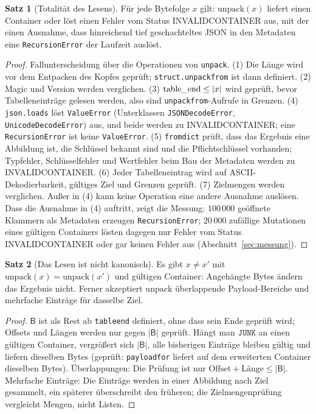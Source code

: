 \documentclass[a4paper,12pt,twoside]{report}
\DeclareRobustCommand{\_}{\ifmmode\mbox{\textunderscore}\else\textunderscore\allowbreak{}\fi}
\theoremstyle{definition}
\newtheorem{satz}{Satz}[chapter]
\begin{document}
\begin{satz}[Totalität des Lesens]
	\label{satz:totalitaet}
	Für jede Bytefolge $x$ gilt: $\mathrm{unpack}(x)$ liefert einen Container oder löst einen Fehler vom Status INVALID\_CONTAINER aus, mit der einen Ausnahme, dass hinreichend tief geschachteltes JSON in den Metadaten eine \texttt{RecursionError} der Laufzeit auslöst.
\end{satz}

\begin{proof}
	Fallunterscheidung über die Operationen von \texttt{unpack}. (1) Die Länge wird vor dem Entpacken des Kopfes geprüft; \texttt{struct.unpack\_from} ist dann definiert. (2) Magic und Version werden verglichen. (3) $\text{table\_end}\le|x|$ wird geprüft, bevor Tabelleneinträge gelesen werden, also sind \texttt{unpack\_from}-Aufrufe in Grenzen. (4) \texttt{json.loads} löst \texttt{ValueError} (Unterklassen \texttt{JSONDecodeError}, \texttt{UnicodeDecodeError}) aus, und beide werden zu INVALID\_CONTAINER; eine \texttt{RecursionError} ist keine \texttt{ValueError}. (5) \texttt{from\_dict} prüft, dass das Ergebnis eine Abbildung ist, die Schlüssel bekannt sind und die Pflichtschlüssel vorhanden; Typfehler, Schlüsselfehler und Wertfehler beim Bau der Metadaten werden zu INVALID\_CONTAINER. (6) Jeder Tabelleneintrag wird auf ASCII-Dekodierbarkeit, gültiges Ziel und Grenzen geprüft. (7) Zielmengen werden verglichen. Außer in (4) kann keine Operation eine andere Ausnahme auslösen. Dass die Ausnahme in (4) auftritt, zeigt die Messung: $100\,000$ geöffnete Klammern als Metadaten erzeugen \texttt{RecursionError}; $20\,000$ zufällige Mutationen eines gültigen Containers lösten dagegen nur Fehler vom Status INVALID\_CONTAINER oder gar keinen Fehler aus (Abschnitt~\ref{sec:messung}).
\end{proof}

\begin{satz}[Das Lesen ist nicht kanonisch]
	\label{satz:nichtkanonisch}
	Es gibt $x\ne x'$ mit $\mathrm{unpack}(x)=\mathrm{unpack}(x')$ und gültigen Container: Angehängte Bytes ändern das Ergebnis nicht. Ferner akzeptiert $\mathrm{unpack}$ überlappende Payload-Bereiche und mehrfache Einträge für dasselbe Ziel.
\end{satz}

\begin{proof}
	$\mathsf B$ ist als Rest ab \texttt{table\_end} definiert, ohne dass sein Ende geprüft wird; Offsets und Längen werden nur gegen $|\mathsf B|$ geprüft. Hängt man $\texttt{JUNK}$ an einen gültigen Container, vergrößert sich $|\mathsf B|$, alle bisherigen Einträge bleiben gültig und liefern dieselben Bytes (geprüft: \texttt{payload\_for} liefert auf dem erweiterten Container dieselben Bytes). Überlappungen: Die Prüfung ist nur $\text{Offset}+\text{Länge}\le|\mathsf B|$. Mehrfache Einträge: Die Einträge werden in einer Abbildung nach Ziel gesammelt, ein späterer überschreibt den früheren; die Zielmengenprüfung vergleicht Mengen, nicht Listen.
\end{proof}
\end{document}
